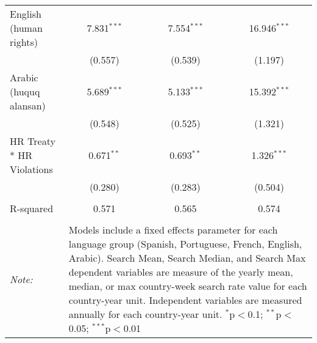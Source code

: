 \begin{table}[!htbp]
\begin{tabular}{@{\extracolsep{5pt}}lccc}
  English (human rights) & 7.831$^{***}$ & 7.554$^{***}$ & 16.946$^{***}$ \\ 
  & (0.557) & (0.539) & (1.197) \\ 
  Arabic (huquq alansan) & 5.689$^{***}$ & 5.133$^{***}$ & 15.392$^{***}$ \\ 
  & (0.548) & (0.525) & (1.321) \\ 
  HR Treaty * HR Violations & 0.671$^{**}$ & 0.693$^{**}$ & 1.326$^{***}$ \\ 
  & (0.280) & (0.283) & (0.504) \\ 
 \hline \\[-1.8ex] 
R-squared  & 0.571 & 0.565 & 0.574 \\ 
\hline 
\hline \\[-1.8ex] 
\textit{Note:}  & \multicolumn{3}{l}{\parbox[t]{8cm}{Models include a fixed effects parameter for each language group (Spanish, Portuguese, French, English, Arabic). Search Mean, Search Median, and Search Max dependent variables are measure of the yearly mean, median, or max country-week search rate value for each country-year unit. Independent variables are measured annually for each country-year unit. $^{*}$p$<$0.1; $^{**}$p$<$0.05; $^{***}$p$<$0.01}} \\ 
\end{tabular} 
\end{table} 
